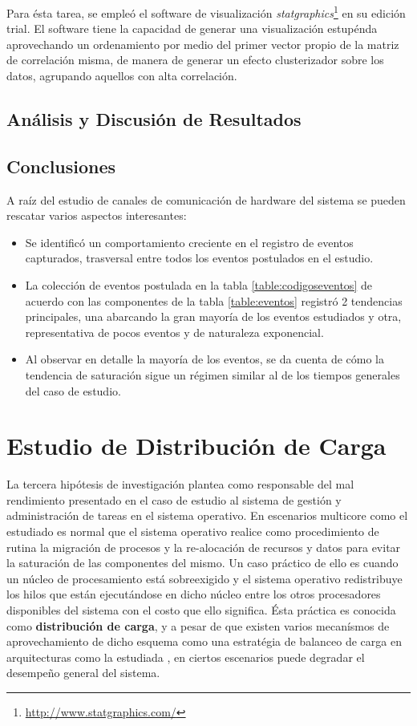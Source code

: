 Para ésta tarea, se empleó el software de visualización \emph{statgraphics}\footnote{\url{http://www.statgraphics.com/}} en su edición trial. El software tiene la capacidad de generar una visualización estupénda aprovechando un ordenamiento por medio del primer vector propio de la matriz de correlación misma, de manera de generar un efecto clusterizador sobre los datos, agrupando aquellos con alta correlación.

\subsection{Análisis y Discusión de Resultados}

\subsection{Conclusiones}
A raíz del estudio de canales de comunicación de hardware del sistema se pueden rescatar varios aspectos interesantes:
\begin{itemize}
\item Se identificó un comportamiento creciente en el registro de eventos capturados, trasversal entre todos los eventos postulados en el estudio.
\item La colección de eventos postulada en la tabla \ref{table:codigoseventos} de acuerdo con las componentes de la tabla \ref{table:eventos} registró 2 tendencias principales, una abarcando la gran mayoría de los eventos estudiados y otra, representativa de pocos eventos y de naturaleza exponencial.
\item Al observar en detalle la mayoría de los eventos, se da cuenta de cómo la tendencia de saturación sigue un régimen similar al de los tiempos generales del caso de estudio.
\end{itemize}

\section{Estudio de Distribución de Carga}
La tercera hipótesis de investigación plantea como responsable del mal rendimiento presentado en el caso de estudio al sistema de gestión y administración de tareas en el sistema operativo. En escenarios multicore como el estudiado es normal que el sistema operativo realice como procedimiento de rutina la migración de procesos y la re-alocación de recursos y datos para evitar la saturación de las componentes del mismo. Un caso práctico de ello es cuando un núcleo de procesamiento está sobreexigido y el sistema operativo redistribuye los hilos que están ejecutándose en dicho núcleo entre los otros procesadores disponibles del sistema con el costo que ello significa. Ésta práctica es conocida como \textbf{distribución de carga}, y a pesar de que existen varios mecanísmos de aprovechamiento de dicho esquema como una estratégia de balanceo de carga en arquitecturas como la estudiada \cite{paper:NUMA}, en ciertos escenarios puede degradar el desempeño general del sistema.

